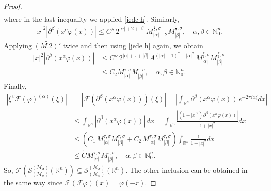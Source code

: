\documentclass{article}
\theoremstyle{thmstyleone}
\theoremstyle{thmstyletwo}%
\theoremstyle{thmstylethree}%
\begin{document}
\begin{proof}
\begin{align*}
   \end{align*}
   where in the last inequality we applied \eqref{jede h}.
   Similarly, 
   \begin{align*}
       |x|^2|\partial^\beta(x^\alpha \varphi(x))|\leq C''\, 2^{|\alpha|+2+|\beta|}\,M^{\frac{\tau}{2},\sigma}_{|\alpha|+2} M^{\frac{\tau}{2},\sigma}_{|\beta|},\quad \alpha,\beta\in\mathbb N_0^n. 
   \end{align*}
   Applying $\widetilde{ (M.2)'}$ twice and then using \eqref{jede h} again, we obtain
    \begin{align*}
       |x|^2|\partial^\beta(x^\alpha \varphi(x))|&\leq C''\, 2^{|\alpha|+2+|\beta|}\,A^{(|\alpha|+1)^\sigma+|\alpha|^\sigma}\,M^{\frac{\tau}{2},\sigma}_{|\alpha|} M^{\frac{\tau}{2},\sigma}_{|\beta|}\\
       &\leq  C_2  M^{\tau,\sigma}_{|\alpha|} M^{\tau,\sigma}_{|\beta|},\quad \alpha,\beta\in\mathbb N_0^n. 
   \end{align*}
   Finally, 
   \begin{align*}
    |\xi^\beta \mathcal{F}(\varphi)^{(\alpha)}(\xi)|& =\left|\mathcal{F}\left(\partial^\beta(x^\alpha\varphi(x))\right)(\xi)\right|=\left|\int_{\mathbb R^n}\partial^\beta(x^\alpha\varphi(x)) \,e^{-2\pi ix\xi}dx\right|\\
    & \leq \int_{\mathbb R^n}|\partial^\beta(x^\alpha\varphi(x))|\,dx=\int_{\mathbb R^n}\frac{|(1+|x|^2)\,\partial^\beta(x^\alpha\varphi(x))|}{1+|x|^2}dx\\
    &\leq \left(C_1\, M^{\tau,\sigma}_{|\alpha|} M^{\tau,\sigma}_{|\beta|} +  C_2\, M^{\tau,\sigma}_{|\alpha|} M^{\tau,\sigma}_{|\beta|}\right)\int_{\mathbb R^n} \frac{1}{1+|x|^2}dx\\
    & \leq \tilde C M^{\tau,\sigma}_{|\alpha|} M^{\tau,\sigma}_{|\beta|}, \quad \alpha,\beta\in \mathbb N_0^n.
   \end{align*}
So, $\mathcal{F} (\mathcal S_{(\mathcal{M}_\sigma)}^{(\mathcal{M}_\sigma)} (\mathbb R^n)) \subseteq \mathcal S_{(\mathcal{M}_\sigma)}^{(\mathcal{M}_\sigma)} (\mathbb R^n).$ The other inclusion can be obtained 
in the same way since $\mathcal{F}(\mathcal{F}\varphi)(x)=\varphi(-x).$ 
\end{proof}
\end{document}
